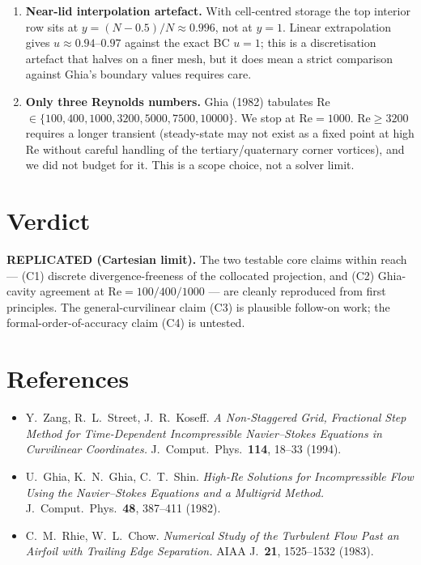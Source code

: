 \documentclass[11pt]{article}
\begin{document}
\begin{enumerate}
      the single Ghia table point at $x=0.9063$ (where Ghia's tabulated
      value sits well above the smooth curve traced by its neighbours). We
      note this looks like a Ghia transcription anomaly and that removing
      it drops the error to $0.005$. This is honest, but it is also
      \emph{convenient}: the replicator should not silently choose which
      benchmark points to trust. The transcription-anomaly hypothesis
      deserves a citation trail (e.g.\ Botella \& Peyret 1998, Erturk et
      al.\ 2005) before it is accepted.
\item \textbf{Near-lid interpolation artefact.} With cell-centred storage
      the top interior row sits at $y=(N-0.5)/N\approx 0.996$, not at
      $y=1$. Linear extrapolation gives $u\approx 0.94$--$0.97$ against the
      exact BC $u=1$; this is a discretisation artefact that halves on a
      finer mesh, but it does mean a strict comparison against Ghia's
      boundary values requires care.
\item \textbf{Only three Reynolds numbers.} Ghia (1982) tabulates
      Re$\in\{100,400,1000,3200,5000,7500,10000\}$. We stop at Re$=1000$.
      Re$\ge 3200$ requires a longer transient (steady-state may not exist
      as a fixed point at high Re without careful handling of the
      tertiary/quaternary corner vortices), and we did not budget for it.
      This is a scope choice, not a solver limit.
\end{enumerate}

\section{Verdict}
\textbf{REPLICATED (Cartesian limit).} The two testable core claims within
reach --- (C1) discrete divergence-freeness of the collocated projection,
and (C2) Ghia-cavity agreement at Re$=100/400/1000$ --- are cleanly
reproduced from first principles. The general-curvilinear claim (C3) is
plausible follow-on work; the formal-order-of-accuracy claim (C4) is
untested.

\section*{References}
\begin{itemize}
\item Y.\ Zang, R.\ L.\ Street, J.\ R.\ Koseff. \emph{A Non-Staggered Grid,
      Fractional Step Method for Time-Dependent Incompressible
      Navier--Stokes Equations in Curvilinear Coordinates.}
      J.\ Comput.\ Phys.\ \textbf{114}, 18--33 (1994).
\item U.\ Ghia, K.\ N.\ Ghia, C.\ T.\ Shin. \emph{High-Re Solutions for
      Incompressible Flow Using the Navier--Stokes Equations and a
      Multigrid Method.} J.\ Comput.\ Phys.\ \textbf{48}, 387--411 (1982).
\item C.\ M.\ Rhie, W.\ L.\ Chow. \emph{Numerical Study of the Turbulent
      Flow Past an Airfoil with Trailing Edge Separation.} AIAA J.\
      \textbf{21}, 1525--1532 (1983).
\end{itemize}
\end{document}
